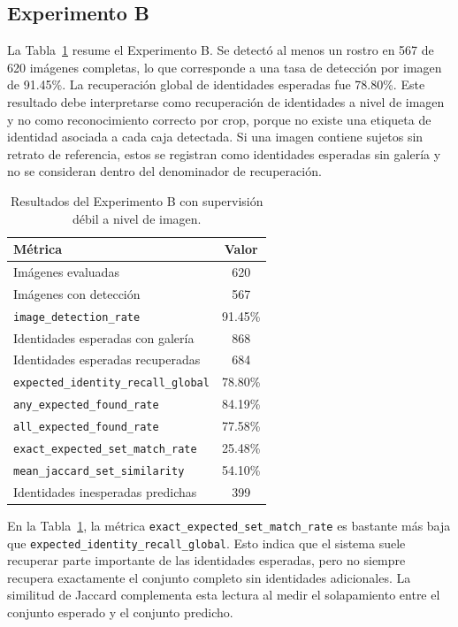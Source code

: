 \documentclass[11pt]{article}
\begin{document}
\subsection{Experimento B}

La Tabla~\ref{tab:exp_b} resume el Experimento B. Se detectó al menos un rostro en 567 de 620 imágenes completas, lo que corresponde a una tasa de detección por imagen de 91.45\%. La recuperación global de identidades esperadas fue 78.80\%. Este resultado debe interpretarse como recuperación de identidades a nivel de imagen y no como reconocimiento correcto por crop, porque no existe una etiqueta de identidad asociada a cada caja detectada. Si una imagen contiene sujetos sin retrato de referencia, estos se registran como identidades esperadas sin galería y no se consideran dentro del denominador de recuperación.

\begin{table}[H]
\centering
\caption{Resultados del Experimento B con supervisión débil a nivel de imagen.}
\label{tab:exp_b}
\begin{tabular}{lc}
\toprule
Métrica & Valor \\
\midrule
Imágenes evaluadas & 620 \\
Imágenes con detección & 567 \\
\texttt{image\_detection\_rate} & 91.45\% \\
Identidades esperadas con galería & 868 \\
Identidades esperadas recuperadas & 684 \\
\texttt{expected\_identity\_recall\_global} & 78.80\% \\
\texttt{any\_expected\_found\_rate} & 84.19\% \\
\texttt{all\_expected\_found\_rate} & 77.58\% \\
\texttt{exact\_expected\_set\_match\_rate} & 25.48\% \\
\texttt{mean\_jaccard\_set\_similarity} & 54.10\% \\
Identidades inesperadas predichas & 399 \\
\bottomrule
\end{tabular}
\end{table}

En la Tabla~\ref{tab:exp_b}, la métrica \texttt{exact\_expected\_set\_match\_rate} es bastante más baja que \texttt{expected\_identity\_recall\_global}. Esto indica que el sistema suele recuperar parte importante de las identidades esperadas, pero no siempre recupera exactamente el conjunto completo sin identidades adicionales. La similitud de Jaccard complementa esta lectura al medir el solapamiento entre el conjunto esperado y el conjunto predicho.
\end{document}
